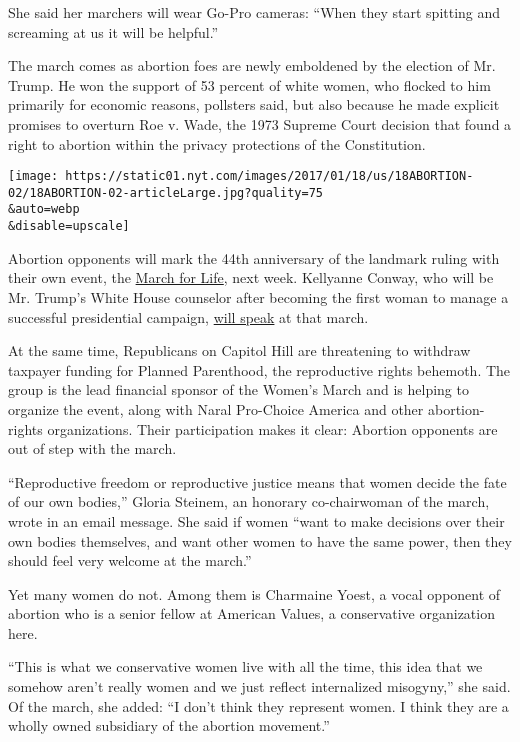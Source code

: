 She said her marchers will wear Go-Pro cameras: ``When they start
spitting and screaming at us it will be helpful.''

The march comes as abortion foes are newly emboldened by the election of
Mr. Trump. He won the support of 53 percent of white women, who flocked
to him primarily for economic reasons, pollsters said, but also because
he made explicit promises to overturn Roe v. Wade, the 1973 Supreme
Court decision that found a right to abortion within the privacy
protections of the Constitution.

\texttt{[image: https://static01.nyt.com/images/2017/01/18/us/18ABORTION-02/18ABORTION-02-articleLarge.jpg?quality=75\\\&auto=webp\\\&disable=upscale]}

Abortion opponents will mark the 44th anniversary of the landmark ruling
with their own event, the \href{http://marchforlife.org/}{March for
Life}, next week. Kellyanne Conway, who will be Mr. Trump's White House
counselor after becoming the first woman to manage a successful
presidential campaign,
\href{https://www.nytimes.com/2017/01/11/us/kellyanne-conway-anti-abortion-march.html}{will
speak} at that march.

At the same time, Republicans on Capitol Hill are threatening to
withdraw taxpayer funding for Planned Parenthood, the reproductive
rights behemoth. The group is the lead financial sponsor of the Women's
March and is helping to organize the event, along with Naral Pro-Choice
America and other abortion-rights organizations. Their participation
makes it clear: Abortion opponents are out of step with the march.

``Reproductive freedom or reproductive justice means that women decide
the fate of our own bodies,'' Gloria Steinem, an honorary co-chairwoman
of the march, wrote in an email message. She said if women ``want to
make decisions over their own bodies themselves, and want other women to
have the same power, then they should feel very welcome at the march.''

Yet many women do not. Among them is Charmaine Yoest, a vocal opponent
of abortion who is a senior fellow at American Values, a conservative
organization here.

``This is what we conservative women live with all the time, this idea
that we somehow aren't really women and we just reflect internalized
misogyny,'' she said. Of the march, she added: ``I don't think they
represent women. I think they are a wholly owned subsidiary of the
abortion movement.''

